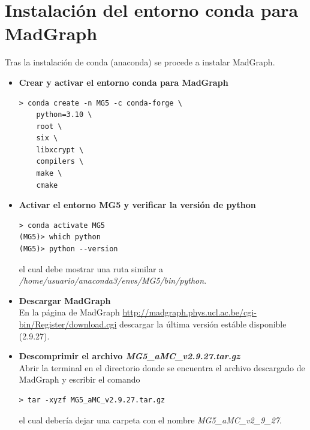 \section{Instalación del entorno conda para MadGraph}
Tras la instalación de conda (anaconda) se procede a instalar MadGraph.
\begin{itemize}
    \item[1)] \textbf{Crear y activar el entorno conda para MadGraph}
    \begin{lstlisting}
> conda create -n MG5 -c conda-forge \
    python=3.10 \
    root \
    six \
    libxcrypt \
    compilers \
    make \
    cmake
\end{lstlisting}
    \item[2)] \textbf{Activar el entorno MG5 y verificar la versión de python}
    \begin{lstlisting}
> conda activate MG5
(MG5)> which python
(MG5)> python --version
\end{lstlisting}
    el cual debe mostrar una ruta similar a \textit{/home/usuario/anaconda3/envs/MG5/bin/python}.
    \item[3)] \textbf{Descargar MadGraph}\\
    En la página de MadGraph \url{http://madgraph.phys.ucl.ac.be/cgi-bin/Register/download.cgi} descargar la última versión estáble disponible (2.9.27).
    \item[4)] \textbf{Descomprimir el archivo \textit{MG5\_aMC\_v2.9.27.tar.gz}}\\
    Abrir la terminal en el directorio donde se encuentra el archivo descargado de MadGraph y escribir el comando
    \begin{lstlisting}
> tar -xyzf MG5_aMC_v2.9.27.tar.gz
\end{lstlisting}
    el cual debería dejar una carpeta con el nombre \textit{MG5\_aMC\_v2\_9\_27}.
\end{itemize}

